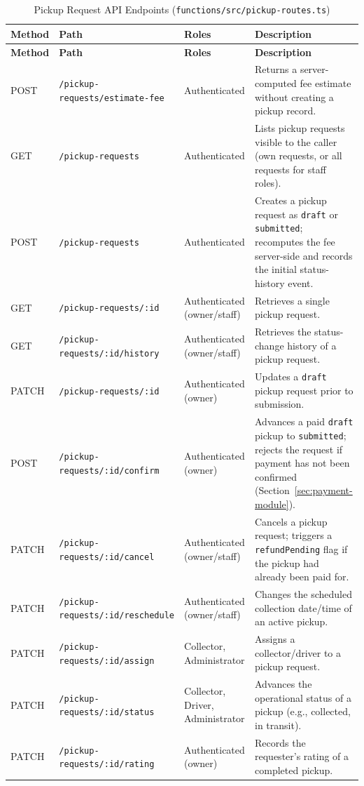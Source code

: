 \begin{longtable}{@{}p{1.6cm}p{5.0cm}p{2.6cm}p{5.4cm}@{}}
\caption{Pickup Request API Endpoints (\texttt{functions/src/pickup-routes.ts})} \label{tab:api-pickup} \\
\toprule \textbf{Method} & \textbf{Path} & \textbf{Roles} & \textbf{Description} \\ \midrule
\endfirsthead
\toprule \textbf{Method} & \textbf{Path} & \textbf{Roles} & \textbf{Description} \\ \midrule
\endhead
POST & \texttt{/pickup-requests/estimate-fee} & Authenticated & Returns a server-computed fee estimate without creating a pickup record. \\
GET & \texttt{/pickup-requests} & Authenticated & Lists pickup requests visible to the caller (own requests, or all requests for staff roles). \\
POST & \texttt{/pickup-requests} & Authenticated & Creates a pickup request as \texttt{draft} or \texttt{submitted}; recomputes the fee server-side and records the initial status-history event. \\
GET & \texttt{/pickup-requests/:id} & Authenticated (owner/staff) & Retrieves a single pickup request. \\
GET & \texttt{/pickup-requests/:id/history} & Authenticated (owner/staff) & Retrieves the status-change history of a pickup request. \\
PATCH & \texttt{/pickup-requests/:id} & Authenticated (owner) & Updates a \texttt{draft} pickup request prior to submission. \\
POST & \texttt{/pickup-requests/:id/confirm} & Authenticated (owner) & Advances a paid \texttt{draft} pickup to \texttt{submitted}; rejects the request if payment has not been confirmed (Section~\ref{sec:payment-module}). \\
PATCH & \texttt{/pickup-requests/:id/cancel} & Authenticated (owner/staff) & Cancels a pickup request; triggers a \texttt{refundPending} flag if the pickup had already been paid for. \\
PATCH & \texttt{/pickup-requests/:id/reschedule} & Authenticated (owner/staff) & Changes the scheduled collection date/time of an active pickup. \\
PATCH & \texttt{/pickup-requests/:id/assign} & Collector, Administrator & Assigns a collector/driver to a pickup request. \\
PATCH & \texttt{/pickup-requests/:id/status} & Collector, Driver, Administrator & Advances the operational status of a pickup (e.g., collected, in transit). \\
PATCH & \texttt{/pickup-requests/:id/rating} & Authenticated (owner) & Records the requester's rating of a completed pickup. \\
\bottomrule
\end{longtable}

